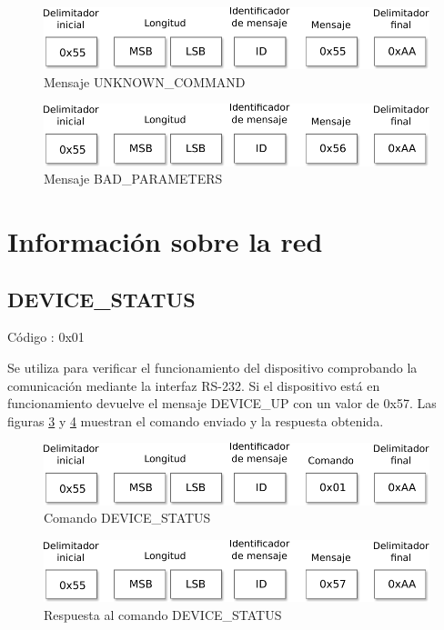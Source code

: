 \begin{figure}
	\centering
	\includegraphics[scale=0.7]{capitulo_3_imgs/res_unknown_cmd.pdf}
	\caption{Mensaje UNKNOWN\_COMMAND}
	\label{fig:res_unknown_cmd}
\end{figure}

\begin{figure}
	\centering
	\includegraphics[scale=0.7]{capitulo_3_imgs/res_bad_parameters.pdf}
	\caption{Mensaje BAD\_PARAMETERS}
	\label{fig:res_bad_parameters}
\end{figure}

\section{Información sobre la red}

\subsection{DEVICE\_STATUS}

Código : 0x01

Se utiliza para verificar el funcionamiento del dispositivo comprobando la comunicación mediante la interfaz RS-232. Si el dispositivo está en funcionamiento devuelve el mensaje DEVICE\_UP con un valor de 0x57. Las figuras \ref{fig:cmd_device_status} y \ref{fig:res_device_status} muestran el comando enviado y la respuesta obtenida. 

\begin{figure}[h]
	\centering
	\includegraphics[scale=0.7]{capitulo_3_imgs/cmd_device_status.pdf}
	\caption{Comando DEVICE\_STATUS}
	\label{fig:cmd_device_status}
\end{figure}

\begin{figure}[h]
	\centering
	\includegraphics[scale=0.7]{capitulo_3_imgs/res_device_status.pdf}
	\caption{Respuesta al comando DEVICE\_STATUS}
	\label{fig:res_device_status}
\end{figure}

